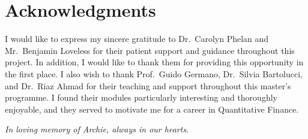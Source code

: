 
\section*{\hspace{0.05\textwidth}Acknowledgments}
\vspace{0.5cm}

\begin{center}

\begin{minipage}{0.9\textwidth}
I would like to express my sincere gratitude to Dr.\ Carolyn Phelan and Mr.\ Benjamin Loveless for their patient support and guidance throughout this project. In addition, I would like to thank them for providing this opportunity in the first place. I also wish to thank Prof.\ Guido Germano, Dr.\ Silvia Bartolucci, and Dr.\ Riaz Ahmad for their teaching and support throughout this master’s programme. I found their modules particularly interesting and thoroughly enjoyable, and they served to motivate me for a career in Quantitative Finance. 
\end{minipage}

\end{center}

\vspace{3.5cm}

\begin{center}
    \textit{In loving memory of Archie, always in our hearts. }
\end{center}
